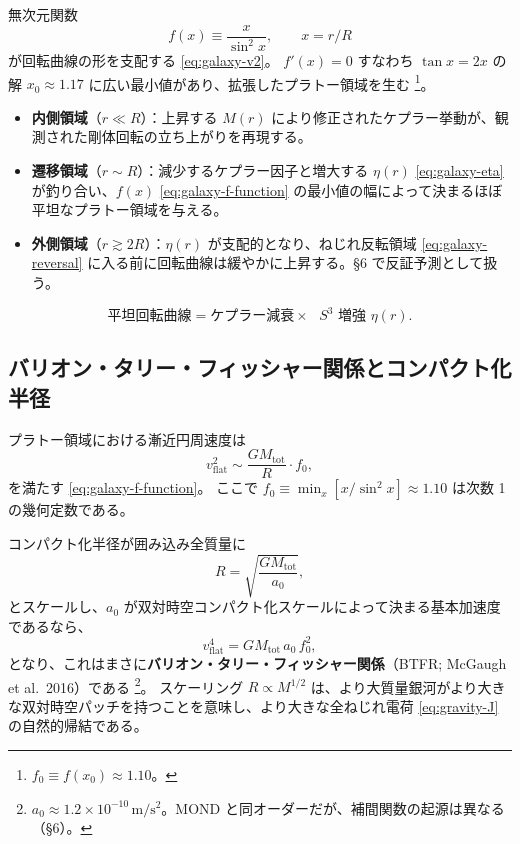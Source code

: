 \documentclass[dvipdfmx,a4paper,oneside]{jsbook}
\numberwithin{equation}{chapter}
\begin{document}
無次元関数
\begin{equation}
  f(x) \equiv \frac{x}{\sin^2 x},
  \qquad x = r/R
  \label{eq:galaxy-f-function}
\end{equation}
が回転曲線の形を支配する \eqref{eq:galaxy-v2}。
\(f'(x) = 0\) すなわち \(\tan x = 2x\) の解 \(x_0 \approx 1.17\) に広い最小値があり、拡張したプラトー領域を生む \footnote{\(f_0 \equiv f(x_0) \approx 1.10\)。}。

\begin{itemize}[leftmargin=2em]
  \item \textbf{内側領域}（\(r \ll R\)）：上昇する \(M(r)\) により修正されたケプラー挙動が、観測された剛体回転の立ち上がりを再現する。
  \item \textbf{遷移領域}（\(r \sim R\)）：減少するケプラー因子と増大する \(\eta(r)\) \eqref{eq:galaxy-eta} が釣り合い、\(f(x)\) \eqref{eq:galaxy-f-function} の最小値の幅によって決まるほぼ平坦なプラトー領域を与える。
  \item \textbf{外側領域}（\(r \gtrsim 2R\)）：\(\eta(r)\) が支配的となり、ねじれ反転領域 \eqref{eq:galaxy-reversal} に入る前に回転曲線は緩やかに上昇する。§6 で反証予測として扱う。
\end{itemize}

\begin{equation}
  \boxed{\;
  \text{平坦回転曲線} = \text{ケプラー減衰} \times \text{ } S^3 \text{ 増強 } \eta(r).
  \;}
  \label{eq:galaxy-flat-boxed}
\end{equation}

\subsection{バリオン・タリー・フィッシャー関係とコンパクト化半径}

プラトー領域における漸近円周速度は
\begin{equation}
  v_{\mathrm{flat}}^2 \sim \frac{GM_{\mathrm{tot}}}{R} \cdot f_0,
  \label{eq:galaxy-vflat}
\end{equation}
を満たす \eqref{eq:galaxy-f-function}。
ここで \(f_0 \equiv \min_x [x/\sin^2 x] \approx 1.10\) は次数 1 の幾何定数である。

コンパクト化半径が囲み込み全質量に
\begin{equation}
  R = \sqrt{\frac{GM_{\mathrm{tot}}}{a_0}},
  \label{eq:galaxy-btfr}
\end{equation}
とスケールし、\(a_0\) が双対時空コンパクト化スケールによって決まる基本加速度であるなら、
\begin{equation}
  v_{\mathrm{flat}}^4 = G M_{\mathrm{tot}} \, a_0 \, f_0^2,
  \label{eq:galaxy-btfr-relation}
\end{equation}
となり、これはまさに\textbf{バリオン・タリー・フィッシャー関係}（BTFR; McGaugh et al.\ 2016）である \footnote{\(a_0 \approx 1.2 \times 10^{-10}\,\mathrm{m/s^2}\)。MOND と同オーダーだが、補間関数の起源は異なる（§6）。}。
スケーリング \(R \propto M^{1/2}\) は、より大質量銀河がより大きな双対時空パッチを持つことを意味し、より大きな全ねじれ電荷 \eqref{eq:gravity-J} の自然的帰結である。
\end{document}
